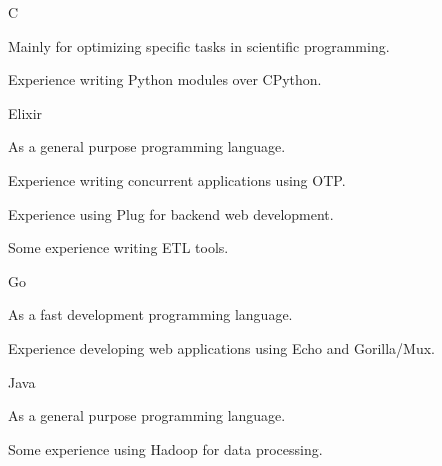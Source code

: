 


\begin{cvskills}


\cvskill
{C} %
{
  \begin{cvitems}
  \item {Mainly for optimizing specific tasks in scientific programming.}
  \item {Experience writing Python modules over CPython.}
  \end{cvitems}
}


\cvskill
{Elixir} %
{
  \begin{cvitems}
  \item {As a general purpose programming language.}
  \item {Experience writing concurrent applications using OTP.}
  \item {Experience using Plug for backend web development.}
  \item {Some experience writing ETL tools.}
  \end{cvitems}
}


\cvskill
{Go} %
{
  \begin{cvitems}
  \item {As a fast development programming language.}
  \item {Experience developing web applications using Echo and Gorilla/Mux.}
  \end{cvitems}
}


\cvskill
{Java} %
{
  \begin{cvitems}
  \item {As a general purpose programming language.}
  \item {Some experience using Hadoop for data processing.}
  \end{cvitems}
}


\end{cvskills}
